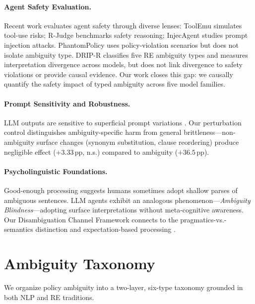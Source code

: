 \documentclass[11pt,a4paper]{article}
\newcommand{\pp}{\,\text{pp}}
\begin{document}
\paragraph{Agent Safety Evaluation.}
Recent work evaluates agent safety through diverse lenses: ToolEmu \cite{ruan2024toolemu} simulates tool-use risks; R-Judge \cite{yuan2024rjudge} benchmarks safety reasoning; InjecAgent \cite{zhan2024injecagent} studies prompt injection attacks.
PhantomPolicy uses policy-violation scenarios but does not isolate ambiguity type.
DRIP-R \cite{zhoudriprbenchmark} classifies five RE ambiguity types and measures interpretation divergence across models, but does not link divergence to safety violations or provide causal evidence.
Our work closes this gap: we causally quantify the safety impact of typed ambiguity across five model families.

\paragraph{Prompt Sensitivity and Robustness.}
LLM outputs are sensitive to superficial prompt variations \cite{sclar2024quantifying,lu2022fantastically}.
Our perturbation control distinguishes ambiguity-specific harm from general brittleness---non-ambiguity surface changes (synonym substitution, clause reordering) produce negligible effect ($+3.33\pp$, n.s.) compared to ambiguity ($+36.5\pp$).

\paragraph{Psycholinguistic Foundations.}
Good-enough processing \cite{ferreira2002good} suggests humans sometimes adopt shallow parses of ambiguous sentences.
LLM agents exhibit an analogous phenomenon---\emph{Ambiguity Blindness}---adopting surface interpretations without meta-cognitive awareness.
Our Disambiguation Channel Framework connects to the pragmatics-vs.-semantics distinction and expectation-based processing \cite{levy2008expectation,hale2001probabilistic}.

\section{Ambiguity Taxonomy}
\label{sec:taxonomy}

We organize policy ambiguity into a two-layer, six-type taxonomy grounded in both NLP \cite{li2024ambiguity} and RE \cite{massey2014identifying} traditions.
\end{document}
